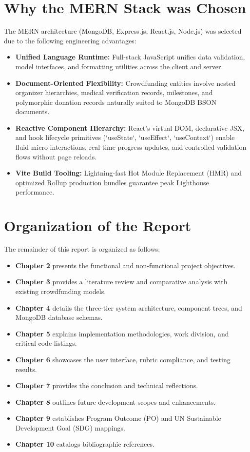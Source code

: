 \documentclass[12pt,a4paper,oneside]{report}
\begin{document}
\section{Why the MERN Stack was Chosen}
The MERN architecture (MongoDB, Express.js, React.js, Node.js) was selected due to the following engineering advantages:
\begin{itemize}
    \item \textbf{Unified Language Runtime:} Full-stack JavaScript unifies data validation, model interfaces, and formatting utilities across the client and server.
    \item \textbf{Document-Oriented Flexibility:} Crowdfunding entities involve nested organizer hierarchies, medical verification records, milestones, and polymorphic donation records naturally suited to MongoDB BSON documents.
    \item \textbf{Reactive Component Hierarchy:} React's virtual DOM, declarative JSX, and hook lifecycle primitives (`useState`, `useEffect`, `useContext`) enable fluid micro-interactions, real-time progress updates, and controlled validation flows without page reloads.
    \item \textbf{Vite Build Tooling:} Lightning-fast Hot Module Replacement (HMR) and optimized Rollup production bundles guarantee peak Lighthouse performance.
\end{itemize}

\section{Organization of the Report}
The remainder of this report is organized as follows:
\begin{itemize}
    \item \textbf{Chapter 2} presents the functional and non-functional project objectives.
    \item \textbf{Chapter 3} provides a literature review and comparative analysis with existing crowdfunding models.
    \item \textbf{Chapter 4} details the three-tier system architecture, component trees, and MongoDB database schemas.
    \item \textbf{Chapter 5} explains implementation methodologies, work division, and critical code listings.
    \item \textbf{Chapter 6} showcases the user interface, rubric compliance, and testing results.
    \item \textbf{Chapter 7} provides the conclusion and technical reflections.
    \item \textbf{Chapter 8} outlines future development scopes and enhancements.
    \item \textbf{Chapter 9} establishes Program Outcome (PO) and UN Sustainable Development Goal (SDG) mappings.
    \item \textbf{Chapter 10} catalogs bibliographic references.
\end{itemize}
\end{document}
